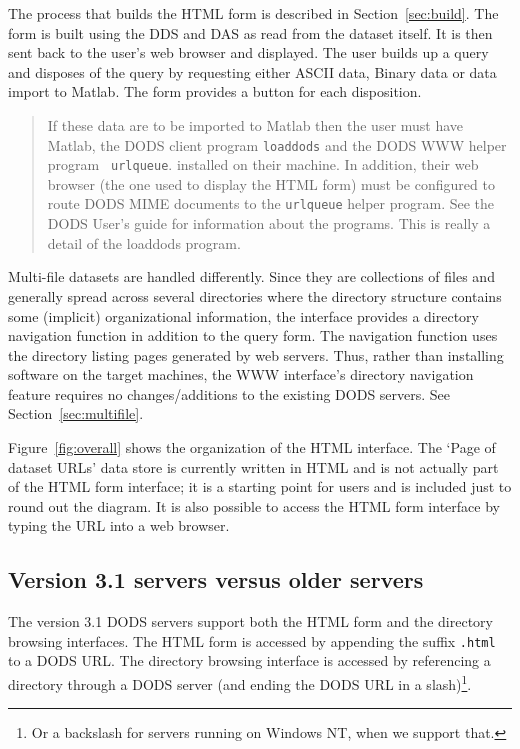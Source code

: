 \documentclass{article}
\begin{document}
The process that builds the HTML form is described in
Section~\ref{sec:build}. The form is built using the DDS and DAS as read from
the dataset itself. It is then sent back to the user's web browser and
displayed. The user builds up a query and disposes of the query by requesting
either ASCII data, Binary data or data import to Matlab. The form provides a
button for each disposition.

\begin{quote}
  If these data are to be imported to Matlab then the user must have Matlab,
  the DODS client program {\tt loaddods} and the DODS WWW helper program {\tt
    urlqueue}.  installed on their machine. In addition, their web browser
  (the one used to display the HTML form) must be configured to route DODS
  MIME documents to the {\tt urlqueue} helper program. See the DODS User's
  guide for information about the programs. This is really a detail of the
  loaddods program.
\end{quote}

Multi-file datasets are handled differently. Since they are collections of
files and generally spread across several directories where the directory
structure contains some (implicit) organizational information, the interface
provides a directory navigation function in addition to the query form. The
navigation function uses the directory listing pages generated by web
servers. Thus, rather than installing software on the target machines, the
WWW interface's directory navigation feature requires no changes/additions to
the existing DODS servers. See Section~\ref{sec:multifile}.

Figure~\ref{fig:overall} shows the organization of the HTML interface. The
`Page of dataset URLs' data store is currently written in HTML and is not
actually part of the HTML form interface; it is a starting point for users
and is included just to round out the diagram. It is also possible to access
the HTML form interface by typing the URL into a web browser.

\subsection{Version 3.1 servers versus older servers}

The version 3.1 DODS servers support both the HTML form and
the directory browsing interfaces. The HTML form is accessed by appending the
suffix {\tt .html} to a DODS URL. The directory browsing interface is
accessed by referencing a directory through a DODS server (and ending the
DODS URL in a slash)\footnote{Or a backslash for servers running on Windows
  NT, when we support that.}. 
\end{document}
